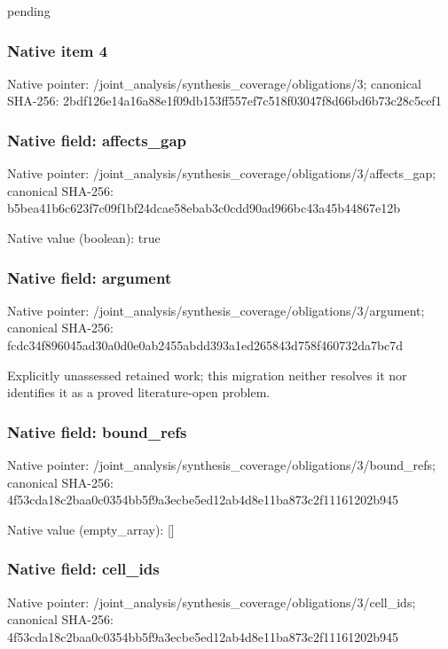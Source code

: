 \documentclass[10pt,a4paper]{article}
\begin{document}
\begingroup\raggedright\sloppy pending\par\endgroup

\subsubsection{Native item 4}
Native pointer: /joint\_\allowbreak{}analysis/synthesis\_\allowbreak{}coverage/obligations/3; canonical SHA-256: 2bdf126e14a16a88e1f09db153ff557ef7c518f03047f8d66bd6b73c28c5cef1

\subsubsection{Native field: affects\_\allowbreak{}gap}
Native pointer: /joint\_\allowbreak{}analysis/synthesis\_\allowbreak{}coverage/obligations/3/affects\_\allowbreak{}gap; canonical SHA-256: b5bea41b6c623f7c09f1bf24dcae58ebab3c0cdd90ad966bc43a45b44867e12b

Native value (boolean): true

\subsubsection{Native field: argument}
Native pointer: /joint\_\allowbreak{}analysis/synthesis\_\allowbreak{}coverage/obligations/3/argument; canonical SHA-256: fcdc34f896045ad30a0d0e0ab2455abdd393a1ed265843d758f460732da7bc7d

\begingroup\raggedright\sloppy Explicitly unassessed retained work;\allowbreak{} this migration neither resolves it nor identifies it as a proved literature-open problem.\par\endgroup

\subsubsection{Native field: bound\_\allowbreak{}refs}
Native pointer: /joint\_\allowbreak{}analysis/synthesis\_\allowbreak{}coverage/obligations/3/bound\_\allowbreak{}refs; canonical SHA-256: 4f53cda18c2baa0c0354bb5f9a3ecbe5ed12ab4d8e11ba873c2f11161202b945

Native value (empty\_\allowbreak{}array): []

\subsubsection{Native field: cell\_\allowbreak{}ids}
Native pointer: /joint\_\allowbreak{}analysis/synthesis\_\allowbreak{}coverage/obligations/3/cell\_\allowbreak{}ids; canonical SHA-256: 4f53cda18c2baa0c0354bb5f9a3ecbe5ed12ab4d8e11ba873c2f11161202b945
\end{document}
